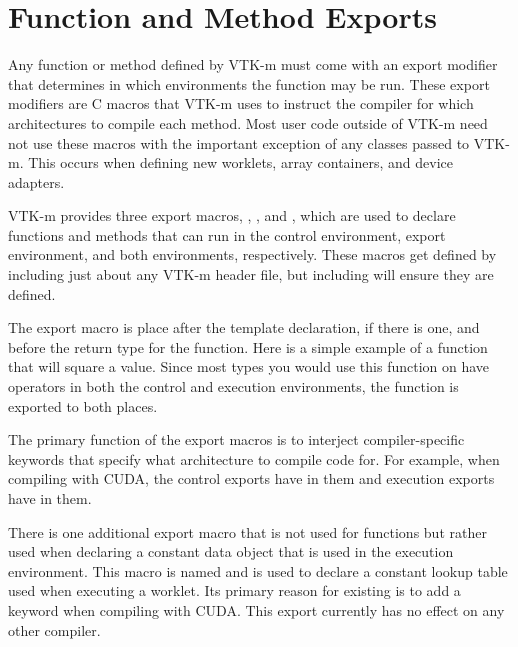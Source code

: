

\section{Function and Method Exports}
\label{sec:FunctionAndMethodExports}

Any function or method defined by VTK-m must come with an export modifier
that determines in which environments the function may be run. These export
modifiers are C macros that VTK-m uses to instruct the compiler for which
architectures to compile each method. Most user code outside of VTK-m need
not use these macros with the important exception of any classes passed to
VTK-m. This occurs when defining new worklets, array containers, and device
adapters.

VTK-m provides three export macros, \vtkmcontexport, \vtkmexecexport, and
\vtkmexeccontexport, which are used to declare functions and methods that
can run in the control environment, export environment, and both
environments, respectively. These macros get defined by including just
about any VTK-m header file, but including  will
ensure they are defined. 

The export macro is place after the template declaration, if there is one,
and before the return type for the function. Here is a simple example of a
function that will square a value. Since most types you would use this
function on have operators in both the control and execution environments,
the function is exported to both places.


The primary function of the export macros is to interject compiler-specific
keywords that specify what architecture to compile code for. For example,
when compiling with CUDA, the control exports have
 in them and execution exports have
 in them.

There is one additional export macro that is not used for functions but
rather used when declaring a constant data object that is used in the
execution environment. This macro is named
and is used to declare a constant lookup table used when executing a
worklet. Its primary reason for existing is to add a
 keyword when compiling with CUDA. This export
currently has no effect on any other compiler.


\section{}
